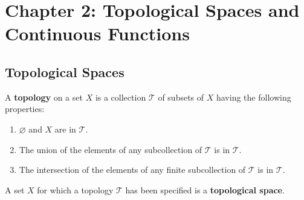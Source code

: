 \newpage

\section{Chapter 2: Topological Spaces and Continuous Functions}
\setcounter{subsection}{11}

\subsection{Topological Spaces}
\begin{definition}[Topology]
A \textbf{topology} on a set $X$ is a collection $\mathscr{T}$ of subsets of $X$ having the following properties:
\begin{enumerate}
    \item $\varnothing$ and $X$ are in $\mathscr{T}$.
    \item The union of the elements of any subcollection of $\mathscr{T}$ is in $\mathscr{T}$.
    \item The intersection of the elements of any finite subcollection of $\mathscr{T}$ is in $\mathscr{T}$.
\end{enumerate}
A set $X$ for which a topology $\mathscr{T}$ has been specified is a \textbf{topological space}.
\end{definition}
